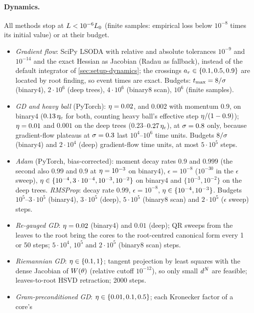 \paragraph{Dynamics.}
All methods stop at $L<10^{-6}L_0$ (finite samples: empirical loss below $10^{-8}$ times its
initial value) or at their budget.
\begin{itemize}
  \item \emph{Gradient flow}: SciPy LSODA with relative and absolute tolerances $10^{-9}$ and
    $10^{-14}$ and the exact Hessian as Jacobian (Radau as fallback), instead of the default
    integrator of \cref{sec:setup-dynamics}; the crossings $a_{r}\in\{0.1,0.5,0.9\}$ are located by
    root finding, so event times are exact. Budgets: $t_{\max}=8/\sigma$ (binary4), $2\cdot10^6$
    (deep trees), $4\cdot10^6$ (binary8 scan), $10^6$ (finite samples).
  \item \emph{GD and heavy ball} (PyTorch): $\eta=0.02$, and $0.002$ with momentum $0.9$, on binary4
    ($0.13\,\eta_c$ for both, counting heavy ball's effective step $\eta/(1-0.9)$); $\eta=0.01$ and
    $0.001$ on the deep trees ($0.23$--$0.27\,\eta_c$), at $\sigma=0.8$ only, because gradient-flow
    plateaus at $\sigma=0.3$ last $10^4$--$10^6$ time units. Budgets $8/\sigma$ (binary4) and $2\cdot10^4$
    (deep) gradient-flow time units, at most $5\cdot10^5$ steps.
  \item \emph{Adam} (PyTorch, bias-corrected): moment decay rates $0.9$ and $0.999$ (the second also $0.99$ and
    $0.9$ at $\eta=10^{-3}$ on binary4), $\epsilon=10^{-8}$ ($10^{-30}$ in the $\epsilon$ sweep),
    $\eta\in\{10^{-4},3\cdot10^{-4},10^{-3},10^{-2}\}$ on binary4 and $\{10^{-3},10^{-2}\}$ on the deep
    trees. \emph{RMSProp}: decay rate $0.99$, $\epsilon=10^{-8}$, $\eta\in\{10^{-4},10^{-3}\}$. Budgets
    $10^5$--$3\cdot10^5$ (binary4), $3\cdot10^5$ (deep), $5\cdot10^5$ (binary8 scan) and $2\cdot10^5$
    ($\epsilon$ sweep) steps.
  \item \emph{Re-gauged GD}: $\eta=0.02$ (binary4) and $0.01$ (deep); QR sweeps from the leaves to
    the root bring the cores to the root-centred canonical form every 1 or 50 steps; $5\cdot10^4$,
    $10^5$ and $2\cdot10^5$ (binary8 scan) steps.
  \item \emph{Riemannian GD}: $\eta\in\{0.1,1\}$; tangent projection by least squares with the dense
    Jacobian of $W(\theta)$ (relative cutoff $10^{-12}$), so only small $d^N$ are feasible;
    leaves-to-root HSVD retraction; 2000 steps.
  \item \emph{Gram-preconditioned GD}: $\eta\in\{0.01,0.1,0.5\}$; each Kronecker factor of a core's

\end{itemize}
